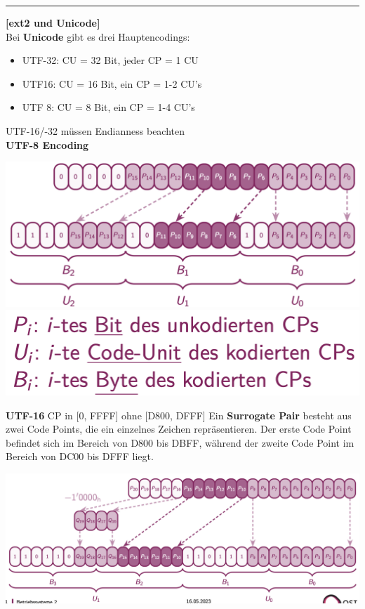 \documentclass[8pt]{extarticle}
\let\oldtextbf\textbf
\renewcommand{\textbf}{\tiny\oldtextbf}
\begin{document}
\begin{multicols*}{5}
	
	\vspace{5pt}
	\rule{\linewidth}{0.4pt}
	\textbf{[ext2 und Unicode]}\\
	
	Bei \textbf{Unicode} gibt es drei Hauptencodings:
	\begin{itemize} [noitemsep, topsep=0pt, leftmargin=*]
		\item UTF-32: CU = 32 Bit, jeder CP = 1 CU
		\item UTF16: CU = 16 Bit, ein CP = 1-2 CU's
		\item UTF 8: CU = 8 Bit, ein CP = 1-4 CU's
	\end{itemize}
	UTF-16/-32 müssen Endianness beachten\\
	
	\textbf{UTF-8 Encoding}
	
	\includegraphics[scale=0.25]{UTF-8.png}
	\includegraphics[scale=0.15]{UTF_Codierung_Begriffe.png}
	
	\textbf{UTF-16} CP in [0, FFFF] ohne [D800, DFFF] Ein \textbf{Surrogate Pair} besteht aus zwei Code Points, die ein einzelnes Zeichen repräsentieren. Der erste Code Point befindet sich im Bereich von D800 bis DBFF, während der zweite Code Point im Bereich von DC00 bis DFFF liegt.
	
	\includegraphics[scale=0.225]{UTF-16.png}%


\end{multicols*}
\end{document}
